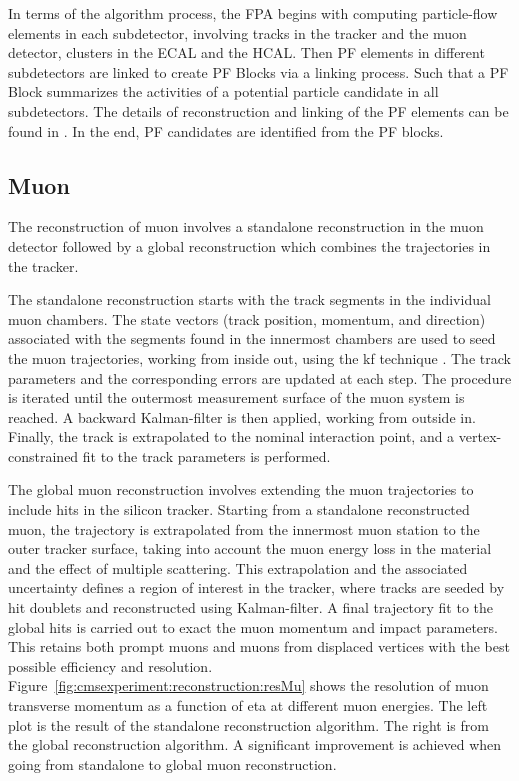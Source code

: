 In terms of the algorithm process, the FPA begins with computing particle-flow elements in each subdetector, involving tracks in the tracker and the muon detector, clusters in the ECAL and the HCAL. Then PF elements in different subdetectors are linked to create PF Blocks via a linking process. Such that a PF Block summarizes the activities of a potential particle candidate in all subdetectors. The details of reconstruction and linking of the PF elements can be found in \cite{cms:particleflow:Sirunyan:2017ulk}. In the end, PF candidates are identified from the PF blocks.




\subsection{Muon}

The reconstruction of muon involves a standalone reconstruction in the muon detector followed by a global reconstruction which combines the trajectories in the tracker. 

The standalone reconstruction starts with the track segments in the individual muon chambers. The state vectors (track position, momentum, and direction) associated with the segments found in the innermost chambers are used to seed the muon trajectories, working from inside out, using the \acrfull{kf} technique \cite{tech:kf:Fruhwirth:1987fm}. The track parameters and the corresponding errors are updated at each step. The procedure is iterated until the outermost measurement surface of the muon system is reached. A backward Kalman-filter is then applied, working from outside in. Finally, the track is extrapolated to the nominal interaction point, and a vertex-constrained fit to the track parameters is performed.

The global muon reconstruction involves extending the muon trajectories to include hits in the silicon tracker. Starting from a standalone reconstructed muon, the trajectory is extrapolated from the innermost muon station to the outer tracker surface, taking into account the muon energy loss in the material and the effect of multiple scattering. This extrapolation and the associated uncertainty defines a region of interest in the tracker, where tracks are seeded by hit doublets and reconstructed using Kalman-filter. A final trajectory fit to the global hits is carried out to exact the muon momentum and impact parameters. This retains both prompt muons and muons from displaced vertices with the best possible efficiency and resolution. Figure~\ref{fig:cmsexperiment:reconstruction:resMu} shows the resolution of muon transverse momentum as a function of eta at different muon energies. The left plot is the result of the standalone reconstruction algorithm. The right is from the global reconstruction algorithm. A significant improvement is achieved when going from standalone to global muon reconstruction.

